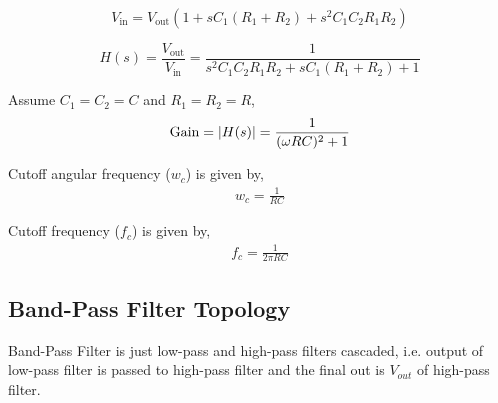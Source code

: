 \documentclass[12pt]{article}
\begin{document}
\begin{equation}
V_{\text{in}} = V_{\text{out}} \left( 1 + s C_1 (R_1 + R_2) + s^2 C_1 C_2 R_1 R_2 \right)
\end{equation}

\begin{equation}
H(s) = \frac{V_{\text{out}}}{V_{\text{in}}} = \frac{1}{s^2 C_1 C_2 R_1 R_2 + s C_1 (R_1 + R_2) + 1}
\end{equation}


Assume $C_1 = C_2 = C$ and $R_1 = R_2 = R$,
\begin{align*}
     \text{Gain} = \abs{H(s)} = \frac{1}{(\omega RC)^2 + 1}
\end{align*}

Cutoff angular frequency ($w_c$) is given by,
\begin{align*}
    w_c = \frac{1}{RC}
\end{align*}

Cutoff frequency ($f_c$) is given by,
\begin{align*}
    f_c = \frac{1}{2\pi RC}
\end{align*}

\subsection{Band-Pass Filter Topology}
Band-Pass Filter is just low-pass and high-pass filters cascaded, i.e. output of low-pass filter is passed to high-pass filter and the final out is $V_{out}$ of high-pass filter.
\end{document}
